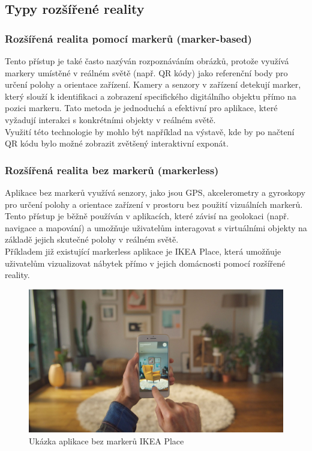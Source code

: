 \subsection{Typy rozšířené reality}
\subsubsection{Rozšířená realita pomocí markerů (marker-based)}
Tento přístup je také často nazýván rozpoznáváním obrázků, protože využívá markery umístěné v reálném světě (např. QR kódy) jako referenční body pro určení polohy a orientace zařízení. Kamery a senzory v zařízení detekují marker, který slouží k identifikaci a zobrazení specifického digitálního objektu přímo na pozici markeru. Tato metoda je jednoduchá a efektivní pro aplikace, které vyžadují interakci s konkrétními objekty v reálném světě. \cite  {AROverview} \\

Využití této technologie by mohlo být například na výstavě, kde by po načtení QR kódu bylo možné zobrazit zvětšený interaktivní exponát.
\subsubsection{Rozšířená realita bez markerů (markerless)}
Aplikace bez markerů využívá senzory, jako jsou GPS, akcelerometry a gyroskopy pro určení polohy a orientace zařízení v prostoru bez použití vizuálních markerů. Tento přístup je běžně používán v aplikacích, které závisí na geolokaci (např. navigace a mapování) a umožňuje uživatelům interagovat s virtuálními objekty na základě jejich skutečné polohy v reálném světě. \cite{AROverview} \\

Příkladem již existující markerless aplikace je IKEA Place, která umožňuje uživatelům vizualizovat nábytek přímo v jejich domácnosti pomocí rozšířené reality. \cite{IkeaPlace} \\
\begin{figure}[h]
    \centering
    \includegraphics[scale=0.2]{images/ikea}
    \caption{Ukázka aplikace bez markerů IKEA Place \cite{IkeaPlace}}
    \label{fig:ikea}
\end{figure}
\pagebreak
